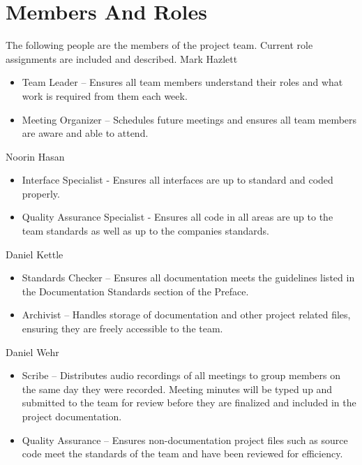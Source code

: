 \documentclass[letterpaper,12pt]{report}
\begin{document}
\section{Members And Roles}
The following people are the members of the project team.  Current role assignments are included and described.\newline
\newline
Mark Hazlett
\begin{itemize}
\item Team Leader – Ensures all team members understand their roles and what work is required from them each week.
\item Meeting Organizer – Schedules future meetings and ensures all team members are aware and able to attend.
\end{itemize}
Noorin Hasan
\begin{itemize}
 \item Interface Specialist - Ensures all interfaces are up to standard and coded properly. 
 \item Quality Assurance Specialist - Ensures all code in all areas are up to the team standards as well as up to the companies standards.
\end{itemize}
Daniel Kettle
\begin{itemize}
\item Standards Checker – Ensures all documentation meets the guidelines listed in the Documentation Standards section of the Preface.
\item Archivist – Handles storage of documentation and other project related files, ensuring they are freely accessible to the team.
\end{itemize}
\pagebreak
Daniel Wehr
\begin{itemize}
 \item Scribe – Distributes audio recordings of all meetings to group members on the same day they were recorded.  Meeting minutes will be typed up and submitted to the team for review before they are finalized and included in the project documentation.
 \item Quality Assurance – Ensures non-documentation project files such as source code meet the standards of the team and have been reviewed for efficiency.
\end{itemize}
\end{document}
